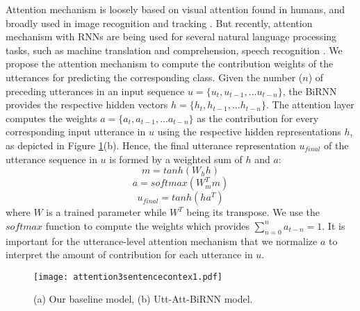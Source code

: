 \documentclass[a4paper]{article}
\begin{document}
Attention mechanism is loosely based on visual attention found in humans, and broadly used in image recognition and tracking \cite{NIPS2010_4089,denil2012learning}. 
But recently, attention mechanism with RNNs are being used for several natural language processing tasks, such as machine translation and comprehension, speech recognition \cite{bahdanau2014neural,vinyals2015grammar,chorowski2015attention}. 
We propose the attention mechanism to compute the contribution weights of the utterances for predicting the corresponding class. 
Given the number ($n$) of preceding utterances in an input sequence $u =  \{u_{t}, u_{t-1},...u_{t-n}\}$, the BiRNN provides the respective hidden vectors $h =  \{h_{t}, h_{t-1},...h_{t-n}\}$. 
The attention layer computes the weights $a = \{a_{t}, a_{t-1},...a_{t-n}\}$ as the contribution for every corresponding input utterance in $u$ using the respective hidden representations $h$, as depicted in Figure \ref{fig:proposed_model}(b). 
Hence, the final utterance representation $u_{final}$ of the utterance sequence in $u$ is formed by a weighted sum of $h$ and $a$:
\begin{equation}
m  = tanh\left(W_{h}h\right)
\end{equation} 
\begin{equation}
a  = softmax\left(W_{m}^{T}m\right)
\end{equation} 
\begin{equation}
u_{final} = tanh\left(ha^{T}\right)
\end{equation} 
where $W$ is a trained parameter while $W^{T}$ being its transpose. We use the $softmax$ function to compute the weights which provides $\sum_{n=0}^{n} a_{t-n} = 1$. It is important for the utterance-level attention mechanism that we normalize $a$ to interpret the amount of contribution for each utterance in $u$. 

\begin{figure}[t]
  \centering
  \texttt{[image: attention3sentencecontex1.pdf]}
  \caption{(a) Our baseline model, (b) Utt-Att-BiRNN model.}
  \label{fig:proposed_model}
\end{figure}
\end{document}
